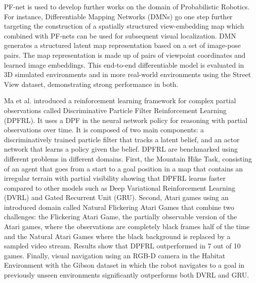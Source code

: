 PF-net is used to develop further works on the domain of Probabilistic Robotics. For instance, Differentiable Mapping Networks (DMNs)\cite{DMNmapRepresentation} go one step further targeting the construction of a spatially structured view-embedding map which combined with PF-nets can be used for subsequent visual localization. DMN generates a structured latent map representation based on a set of image-pose pairs. The map representation is made up of pairs of viewpoint coordinates and learned image embeddings. This end-to-end differentiable model is evaluated in 3D simulated environments\cite{3DenvNeuralSceneRepr}\cite{Rosenbaum2018LearningMF} and in more real-world environments using the Street View dataset\cite{StreetViewMapsDS}, demonstrating strong performance in both.

Ma et al.\cite{ma2020discriminative} introduced a reinforcement learning framework for complex partial observations called Discriminative Particle Filter Reinforcement Learning (DPFRL). It uses a DPF in the neural network policy for reasoning with partial observations over time. It is composed of two main components: a discriminatively trained particle filter that tracks a latent belief, and an actor network that learns a policy given the belief. DPFRL are benchmarked using different problems in different domains. First, the Mountain Hike Task\cite{Igl2018DeepRLPOMDPs}, consisting of an agent that goes from a start to a goal position in a map that contains an irregular terrain with partial visibility showing that DPFRL learns faster compared to other models such as Deep Variational Reinforcement Learning (DVRL)\cite{Igl2018DeepRLPOMDPs} and Gated Recurrent Unit (GRU)\cite{DBLP:journals/corr/ChoMGBSB14}. Second, Atari games using an introduced domain called Natural Flickering Atari Games that combine two challenges: the Flickering Atari Game, the partially observable version of the Atari games, where the observations are completely black frames half of the time and the Natural Atari Games where the black background is replaced by a sampled video stream. Results show that DPFRL outperformed in 7 out of 10 games. Finally, visual navigation using an RGB-D camera in the Habitat Environment\cite{DBLP:journals/corr/abs-1904-01201} with the Gibson dataset\cite{DBLP:journals/corr/abs-1808-10654} in which the robot navigates to a goal in previously unseen environments significantly outperforms both DVRL and GRU. 

